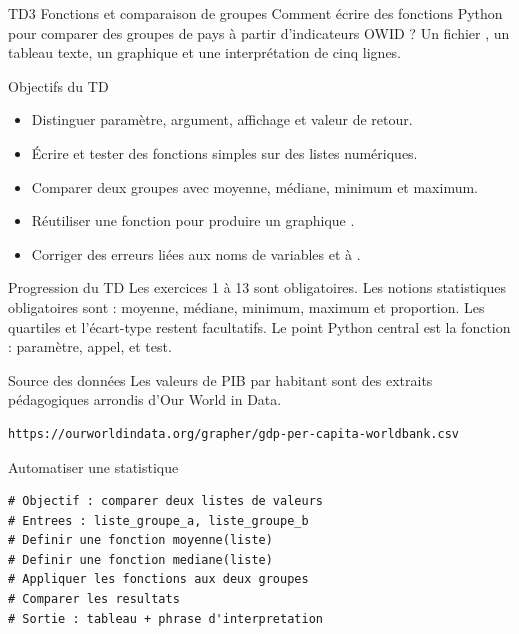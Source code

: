 \documentclass[11pt,a4paper]{article}
\begin{document}
\workbooktitle
  {TD3}
  {Fonctions et comparaison de groupes}
  {Comment écrire des fonctions Python pour comparer des groupes de pays à partir d'indicateurs OWID ?}
  {Un fichier , un tableau texte, un graphique  et une interprétation de cinq lignes.}

\begin{objectivebox}{Objectifs du TD}
\begin{itemize}
  \item Distinguer paramètre, argument, affichage et valeur de retour.
  \item Écrire et tester des fonctions simples sur des listes numériques.
  \item Comparer deux groupes avec moyenne, médiane, minimum et maximum.
  \item Réutiliser une fonction pour produire un graphique .
  \item Corriger des erreurs liées aux noms de variables et à .
\end{itemize}
\end{objectivebox}

\begin{checkpointbox}{Progression du TD}
Les exercices 1 à 13 sont obligatoires. Les notions statistiques obligatoires sont : moyenne, médiane, minimum, maximum et proportion. Les quartiles et l'écart-type restent facultatifs. Le point Python central est la fonction : paramètre, appel,  et test.
\end{checkpointbox}

\begin{checkpointbox}{Source des données}
Les valeurs de PIB par habitant sont des extraits pédagogiques arrondis d'Our World in Data.
\begin{lstlisting}[language=terminal]
https://ourworldindata.org/grapher/gdp-per-capita-worldbank.csv
\end{lstlisting}
\end{checkpointbox}

\begin{pseudocodeexercise}{Automatiser une statistique}
\begin{lstlisting}
# Objectif : comparer deux listes de valeurs
# Entrees : liste_groupe_a, liste_groupe_b
# Definir une fonction moyenne(liste)
# Definir une fonction mediane(liste)
# Appliquer les fonctions aux deux groupes
# Comparer les resultats
# Sortie : tableau + phrase d'interpretation
\end{lstlisting}
\end{pseudocodeexercise}
\end{document}
